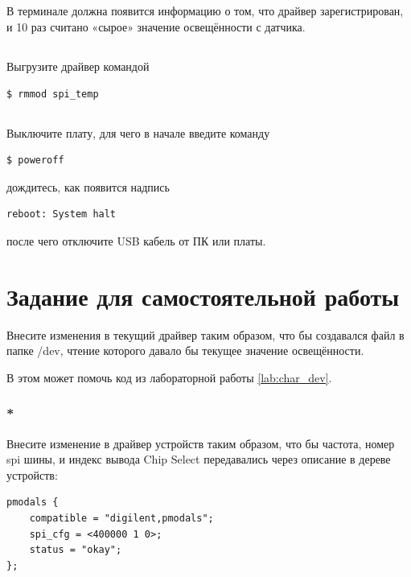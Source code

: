\subsection{} В терминале должна появится информацию о том, что драйвер зарегистрирован, и 10 раз считано «сырое» значение освещённости с датчика.

\subsection{} Выгрузите драйвер командой
\begin{lstlisting}[style=bash]
$ rmmod spi_temp
\end{lstlisting}

\subsection{} Выключите плату, для чего в начале введите команду
\begin{lstlisting}[style=bash]
	$ poweroff
\end{lstlisting}
дождитесь, как появится надпись
\begin{lstlisting}[style=stdout]
	reboot: System halt
\end{lstlisting}
после чего отключите USB кабель от ПК или платы. 

\section{Задание для самостоятельной работы}
Внесите изменения в текущий драйвер таким образом, что бы создавался файл в папке /dev, чтение которого давало бы текущее значение освещённости.

В этом может помочь код из лабораторной работы \ref{lab:char_dev}.

\subsubsection{*}
Внесите изменение в драйвер устройств таким образом, что бы частота, номер spi шины, и индекс вывода Chip Select передавались через описание в дереве устройств:
\begin{lstlisting}[style=stdout]
pmodals {
	compatible = "digilent,pmodals";
	spi_cfg = <400000 1 0>;	  
	status = "okay";
};
\end{lstlisting}